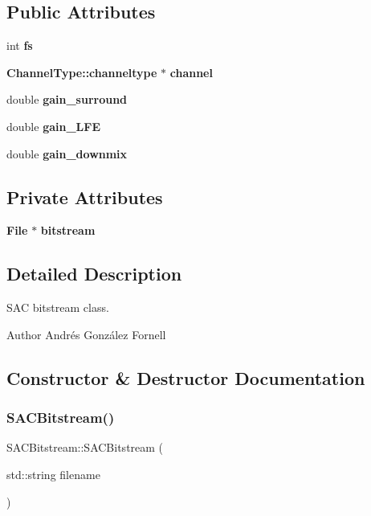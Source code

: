 \subsection*{Public Attributes}
\begin{DoxyCompactItemize}
\item 
int \textbf{ fs}
\item 
\textbf{ Channel\+Type\+::channeltype} $\ast$ \textbf{ channel}
\item 
double \textbf{ gain\+\_\+surround}
\item 
double \textbf{ gain\+\_\+\+L\+FE}
\item 
double \textbf{ gain\+\_\+downmix}
\end{DoxyCompactItemize}
\subsection*{Private Attributes}
\begin{DoxyCompactItemize}
\item 
\textbf{ File} $\ast$ \textbf{ bitstream}
\end{DoxyCompactItemize}


\subsection{Detailed Description}
S\+AC bitstream class. 

\begin{DoxyAuthor}{Author}
Andrés González Fornell 
\end{DoxyAuthor}


\subsection{Constructor \& Destructor Documentation}
\mbox{\label{class_s_a_c_bitstream_a46fe059e932c2e72d07b4dbf982e6533}} 
\subsubsection{S\+A\+C\+Bitstream()}
{\footnotesize\ttfamily S\+A\+C\+Bitstream\+::\+S\+A\+C\+Bitstream (\begin{DoxyParamCaption}\item[{std\+::string}]{filename }\end{DoxyParamCaption})}



